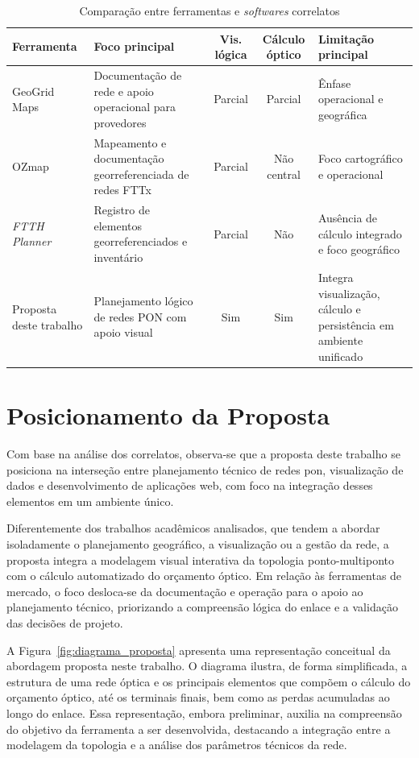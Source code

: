 \begin{table}[htb]
    \centering
    \caption{Comparação entre ferramentas e \textit{softwares} correlatos}
    \label{tab:comparativo_ferramentas}
    \small
    \begin{tabularx}{\textwidth}{|p{3.0cm}|X|c|c|X|}
        \hline
        \textbf{Ferramenta} & \textbf{Foco principal} & \textbf{Vis. lógica} & \textbf{Cálculo óptico} & \textbf{Limitação principal} \\
        \hline
        GeoGrid Maps & Documentação de rede e apoio operacional para provedores & Parcial & Parcial & Ênfase operacional e geográfica \\
        \hline
        OZmap & Mapeamento e documentação georreferenciada de redes FTTx & Parcial & Não central & Foco cartográfico e operacional \\
        \hline
        \textit{FTTH Planner} & Registro de elementos georreferenciados e inventário & Parcial & Não & Ausência de cálculo integrado e foco geográfico \\
        \hline
        Proposta deste trabalho & Planejamento lógico de redes PON com apoio visual & Sim & Sim & Integra visualização, cálculo e persistência em ambiente unificado\\
        \hline
    \end{tabularx}
\end{table}

\section{Posicionamento da Proposta}

Com base na análise dos correlatos, observa-se que a proposta deste trabalho se posiciona na interseção entre planejamento técnico de redes \gls{pon}, visualização de dados e desenvolvimento de aplicações web, com foco na integração desses elementos em um ambiente único. 

Diferentemente dos trabalhos acadêmicos analisados, que tendem a abordar isoladamente o planejamento geográfico, a visualização ou a gestão da rede, a proposta integra a modelagem visual interativa da topologia ponto-multiponto com o cálculo automatizado do orçamento óptico. Em relação às ferramentas de mercado, o foco desloca-se da documentação e operação para o apoio ao planejamento técnico, priorizando a compreensão lógica do enlace e a validação das decisões de projeto. 

A Figura~\ref{fig:diagrama_proposta} apresenta uma representação conceitual da abordagem proposta neste trabalho. O diagrama ilustra, de forma simplificada, a estrutura de uma rede óptica e os principais elementos que compõem o cálculo do orçamento óptico, até os terminais finais, bem como as perdas acumuladas ao longo do enlace. Essa representação, embora preliminar, auxilia na compreensão do objetivo da ferramenta a ser desenvolvida, destacando a integração entre a modelagem da topologia e a análise dos parâmetros técnicos da rede. 

